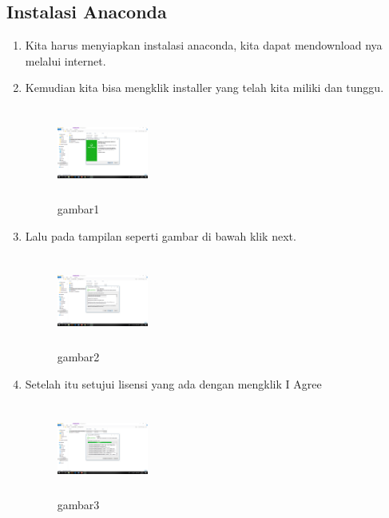 \subsection{Instalasi Anaconda}
\begin{enumerate}
    \item Kita harus menyiapkan instalasi anaconda, kita dapat mendownload nya melalui internet.
    \item Kemudian kita bisa mengklik installer yang telah kita miliki dan tunggu.
    \begin{figure}[!Htbp]
        \centering
        \includegraphics[width=3cm,height=3cm]{figures/1.png}
        \caption{gambar1}
        \label{awal}
        \end{figure}

    \item Lalu pada tampilan seperti gambar di bawah klik next.
    \begin{figure}[!htbp]
        \centering
        \includegraphics[width=3cm,height=3cm]{figures/2.png}
        \caption{gambar2}
        \label{next}
        \end{figure}

    \item Setelah itu setujui lisensi yang ada dengan mengklik I Agree
    \begin{figure}[!htbp]
        \centering
        \includegraphics[width=3cm,height=3cm]{figures/3.png}
        \caption{gambar3}
        \label{lisensi}
        \end{figure}


\end{enumerate}
